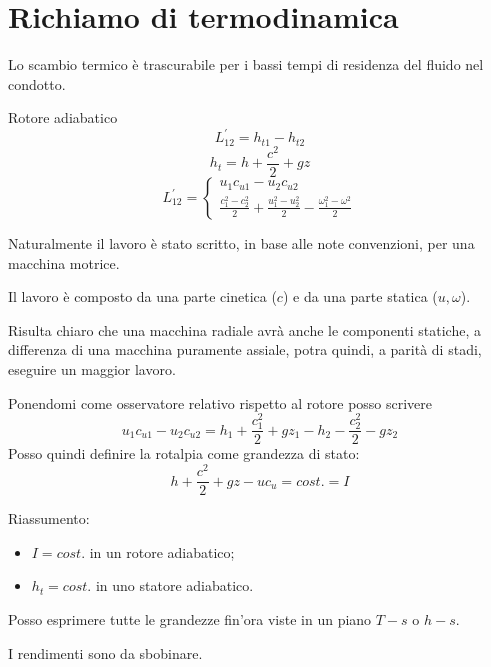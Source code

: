 \section{Richiamo di termodinamica}
Lo scambio termico è trascurabile per i bassi tempi di residenza del fluido nel condotto.

Rotore adiabatico
\begin{equation}
L_{12}^{'} = h_{t1}-h_{t2}
\end{equation}
\begin{equation}
h_t=h+\frac{c^2}{2}+gz
\end{equation}
\begin{equation}
L_{12}^{'} = \begin{cases} u_1 c_{u1}-u_2 c_{u2}\\
\frac{c_1^2-c_2^2}{2}+\frac{u_1^2-u_2^2}{2}-\frac{\omega_1^2-\omega^2}{2} \end{cases}
\end{equation}

Naturalmente il lavoro è stato scritto, in base alle note convenzioni, per una macchina motrice.

Il lavoro è composto da una parte cinetica ($c$) e da una parte statica ($u,\omega$). 

Risulta chiaro che una macchina radiale avrà anche le componenti statiche, a differenza di una macchina puramente assiale, potra quindi, a parità di stadi, eseguire un maggior lavoro.

Ponendomi come osservatore relativo rispetto al rotore posso scrivere
\begin{equation}
u_1 c_{u1} - u_2 c_{u2} = h_1 + \frac{c_1^2}{2}+gz_1-h_2-\frac{c_2^2}{2}-gz_2
\end{equation}
Posso quindi definire la rotalpia come grandezza di stato:
\begin{equation}
h+\frac{c^2}{2}+gz-u c_u = cost. = I
\end{equation}

Riassumento:
\begin{itemize}
\item $I=cost.$ in un rotore adiabatico;
\item $h_t=cost.$ in uno statore adiabatico.
\end{itemize}

Posso esprimere tutte le grandezze fin'ora viste in un piano $T-s$ o $h-s$.

I rendimenti sono da sbobinare.
\pagebreak